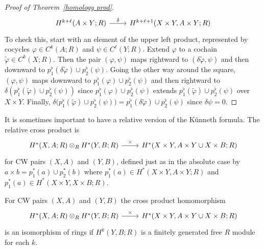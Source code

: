 \begin{proof}[Proof of Theorem~\ref{homology prod}]
\[\begin{tikzcd}
H^{k+\ell}(A\times Y;R)\ar[r,"\delta"]&H^{k+\ell+1}(X\times Y,A\times Y;R)
\end{tikzcd}\]
To check this, start with an element of the upper left product, represented by cocycles $\varphi\in C^k(A;R)$ and $\psi\in C^\ell(Y;R)$. Extend $\varphi$ to a cochain $\widetilde{\varphi}\in C^k(X;R)$. Then the pair $(\varphi,\psi)$ maps rightward to $(\delta\widetilde{\varphi},\psi)$ and then downward to $p^\flat_1(\delta\widetilde{\varphi})\cup p^\flat_2(\psi)$. Going the other way around the square, $(\varphi,\psi)$ maps downward to $p^\flat_1(\varphi)\cup p^\flat_2(\psi)$ and then rightward to $\delta(p^\flat_1(\widetilde{\varphi})\cup p^\flat_2(\psi))$ since $p^\flat_1(\varphi)\cup p^\flat_2(\psi)$ extends $p^\flat_1(\widetilde{\varphi})\cup p^\flat_2(\psi)$ over
$X\times Y$. Finally, $\delta\big(p^\flat_1(\widetilde{\varphi})\cup p^\flat_2(\psi)\big)=p^\flat_1(\delta\widetilde{\varphi})\cup p^\flat_2(\psi)$  since $\delta\psi=0$.
\end{proof}
It is sometimes important to have a relative version of the K\"unneth formula. The relative cross product is
\[\begin{tikzcd}
H^*(X,A;R)\otimes_R H^*(Y,B;R)\ar[r,"\times"]&H^*(X\times Y,A\times Y\cup X\times B;R)
\end{tikzcd}\]
for CW pairs $(X,A)$ and $(Y,B)$, defined just as in the absolute case by $a\times b=p^*_1(a)\cup p^*_2(b)$ where $p^*_1(a)\in H^*(X\times Y,A\times Y;R)$ and $p^*_1(a)\in H^*(X\times Y,X\times B;R)$.
\begin{theorem}\label{Kunneth formula}
For CW pairs $(X,A)$ and $(Y,B)$ the cross product homomorphism 
\[\begin{tikzcd}
H^*(X,A;R)\otimes_RH^*(Y,B;R)\ar[r,"\times"]&H^*(X\times Y,A\times Y\cup X\times B;R)
\end{tikzcd}\]
is an isomorphism of rings if $H^k(Y,B;R)$ is a finitely generated free $R$ module for each $k$.
\end{theorem}

